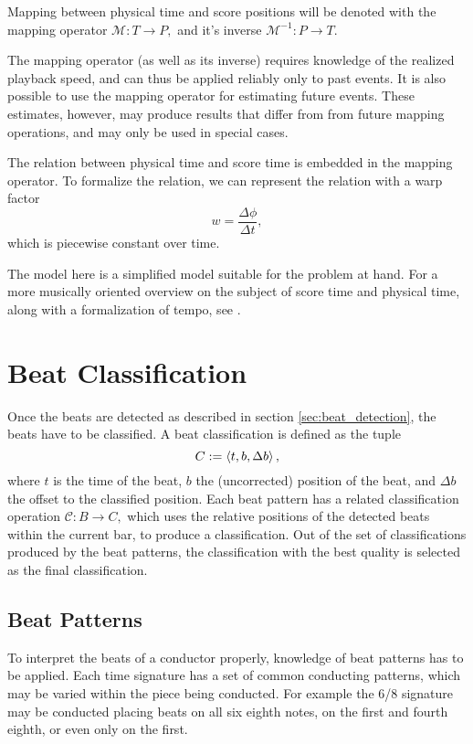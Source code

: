 Mapping between physical time and score positions will be denoted with
the mapping operator
$ \mathcal{M} : T \rightarrow P, $
and it's inverse
$ \mathcal{M}^{-1} : P \rightarrow T. $

The mapping operator (as well as its inverse)
requires knowledge of
the realized playback speed,
and can thus be applied reliably only to past events.
It is also possible to use the mapping operator for
estimating future events.
These estimates, however,
may produce results that differ from
from future mapping operations,
and may only be used in special cases.

The relation between physical time and score time
is embedded in the mapping operator.
To formalize the relation, we can
represent the relation with a warp factor
\begin{equation}
w = \frac{\Delta \phi}{\Delta t},
\end{equation}
which is piecewise constant over time.

The model here is a simplified model
suitable for the problem at hand.
For a more musically oriented overview
on the subject of score time and physical time,
along with a formalization of tempo,
see \cite{Mazzola2011}.


\section{Beat Classification}

Once the beats are detected as described
in section \ref{sec:beat_detection},
the beats have to be classified.
A beat classification is defined as the tuple
\[
C := \left \langle t, b, \Delta b \right \rangle ,
\]
where $t$ is the time of the beat,
$b$ the (uncorrected) position of the beat,
and $\Delta b$ the offset to the classified position.
Each beat pattern has a related
classification operation $ \mathcal{C} : B \rightarrow C, $
which uses the relative positions of the detected beats
within the current bar,
to produce a classification.
Out of the set of classifications produced by the beat patterns,
the classification with the best quality is
selected as the final classification.

\subsection{Beat Patterns}

To interpret the beats of a conductor properly,
knowledge of beat patterns has to be applied.
Each time signature has a set of common conducting patterns,
which may be varied within the piece being conducted.
For example the 6/8 signature may be conducted
placing beats on
all six eighth notes,
on the first and fourth eighth,
or even only on the first.

